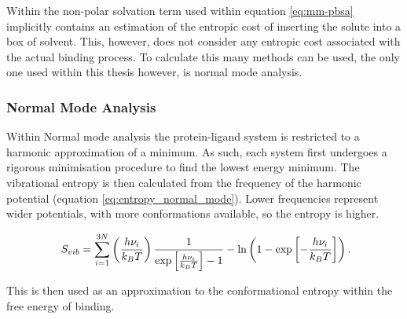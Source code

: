 Within the non-polar solvation term used within equation \ref{eq:mm-pbsa} implicitly contains an estimation of the entropic cost of inserting the solute into a box of solvent.  This, however, does not consider any entropic cost associated with the actual binding process\cite{pbsa_background}.  To calculate this many methods can be used, the only one used within this thesis however, is normal mode analysis.

\subsubsection{Normal Mode Analysis}

Within Normal mode analysis the protein-ligand system is restricted to a harmonic approximation of a minimum.  As such, each system first undergoes a rigorous minimisation procedure to find the lowest energy minimum.  The vibrational entropy is then calculated from the frequency of the harmonic potential (equation \ref{eq:entropy_normal_mode}).  Lower frequencies represent wider potentials, with more conformations available, so the entropy is higher\cite{normal_mode}.

\begin{equation} \label{eq:entropy_normal_mode}
\ S_{vib} = \sum_{i=1}^{3N} \left( \frac{h \nu_{i}}{k_B T} \right) \frac{1}{\exp \left[ \frac{h \nu_{i}}{k_BT} \right] -1 } - \ln\left(1- \exp \left[ -\frac{h\nu_{i}}{k_BT}  \right]\right) \\.
\end{equation}

This is then used as an approximation to the conformational entropy within the free energy of binding.